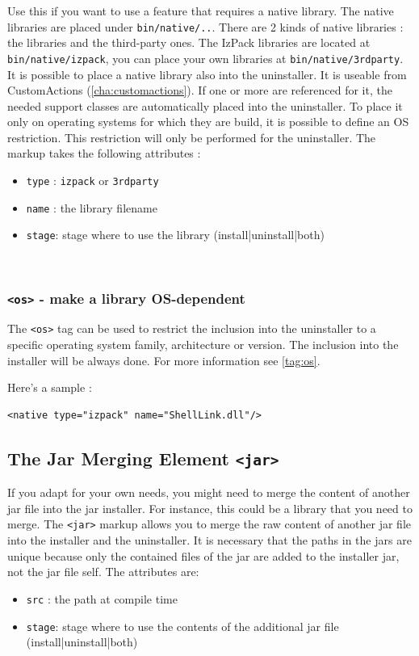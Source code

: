 Use this if you want to use a feature that requires a native library.
The native libraries are placed under \texttt{bin/native/..}. There are 2
kinds of native libraries : the \IzPack libraries and the third-party
ones. The IzPack libraries are located at \texttt{bin/native/izpack},
you can place your own libraries at \texttt{bin/native/3rdparty}. 
It is possible to place a native library also into the uninstaller. 
It is useable from CustomActions (\ref{cha:customactions}). If one or 
more are referenced for it, the needed support classes are automatically
placed into the uninstaller. To place it only on operating systems
for which they are build, it is possible to define an OS
restriction. This restriction will only be performed for the
uninstaller. The markup takes the following attributes :\begin{itemize}

  \item \texttt{type} : \texttt{izpack} or \texttt{3rdparty}
  \item \texttt{name} : the library filename
  \item \texttt{stage}: stage where to use the library
  (install|uninstall|both)

\end{itemize}\
\subsubsection{\texttt{<os>} - make a library OS-dependent}

The \texttt{<os>} tag can be used to restrict the inclusion into
the uninstaller to a specific operating system family,
architecture or version. The inclusion into the installer will be
always done. For more information see \ref{tag:os}.

Here's a sample :
\footnotesize
\begin{verbatim}
<native type="izpack" name="ShellLink.dll"/>
\end{verbatim}
\normalsize

\subsection{The Jar Merging Element \texttt{<jar>}}
\label{jar-element}

If you adapt \IzPack for your own needs, you might need to merge the
content of another jar file into the jar installer. For instance, this
could be a library that you need to merge. The \texttt{<jar>} markup
allows you to merge the raw content of another jar file into the 
installer and the uninstaller. It is necessary that the paths in the
jars are unique because only the contained files of the jar are added
to the installer jar, not the jar file self.
The attributes are:\begin{itemize}
\item \texttt{src} : the path at compile time
\item \texttt{stage}: stage where to use the contents of the additional jar file
  (install|uninstall|both)

\end{itemize}\


